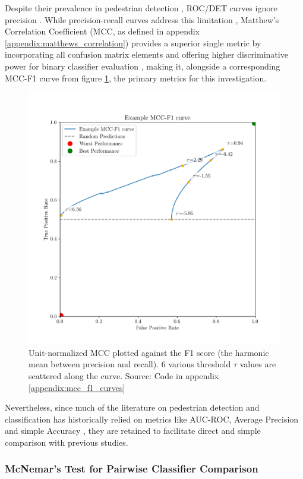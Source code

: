 Despite their prevalence in pedestrian detection \cite{dalal_2005_histograms} \cite{dollar_2012_pedestrian} \cite{dollar_2009_pedestrian}, ROC/DET curves ignore precision \cite{chicco_eval_2023} \cite{chicco_jurman_2020_mcc_f1}. While precision-recall curves address this limitation \cite{chicco_jurman_2020_mcc_f1}, Matthew's Correlation Coefficient (MCC, as defined in appendix \ref{appendix:matthews_correlation}) provides a superior single metric by incorporating all confusion matrix elements and offering higher discriminative power for binary classifier evaluation \cite{Maier_Hein_2024_mcc_proposal} \cite{chicco_eval_2023}, making it, alongside a corresponding MCC-F1 curve from figure \ref{fig:mcc_f1_example}, the primary metrics for this investigation.
\begin{figure}
    \centering
    \includegraphics[width=0.75\linewidth]{images/mcc_f1_example.png}
    \caption{Unit-normalized MCC plotted against the F1 score (the harmonic mean between precision and recall). 6 various threshold $\tau$ values are scattered along the curve. Source: Code in appendix \ref{appendix:mcc_f1_curves}}
    \label{fig:mcc_f1_example}
\end{figure}

Nevertheless, since much of the literature on pedestrian detection and classification has historically relied on metrics like AUC-ROC, Average Precision and simple Accuracy \cite{dalal_2005_histograms} \cite{dollar_2012_pedestrian}, they are retained to facilitate direct and simple comparison with previous studies.

\subsubsection{McNemar's Test for Pairwise Classifier Comparison}


